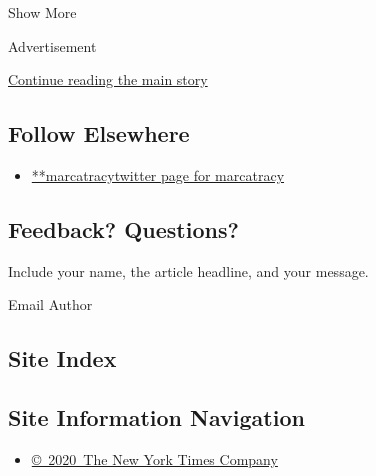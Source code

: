 Show More

Advertisement

\protect\hyperlink{after-mid2}{Continue reading the main story}

\hypertarget{follow-elsewhere}{%
\subsection{Follow Elsewhere}\label{follow-elsewhere}}

\begin{itemize}
\tightlist
\item
  \href{https://twitter.com/marcatracy}{**marcatracytwitter page for
  marcatracy}
\end{itemize}

\hypertarget{feedback-questions}{%
\subsection{Feedback? Questions?}\label{feedback-questions}}

Include your name, the article headline, and your message.

Email Author

\hypertarget{site-index}{%
\subsection{Site Index}\label{site-index}}

\hypertarget{site-information-navigation}{%
\subsection{Site Information
Navigation}\label{site-information-navigation}}

\begin{itemize}
\tightlist
\item
  \href{https://help.nytimes3xbfgragh.onion/hc/en-us/articles/115014792127-Copyright-notice}{©~2020~The
  New York Times Company}
\end{itemize}

